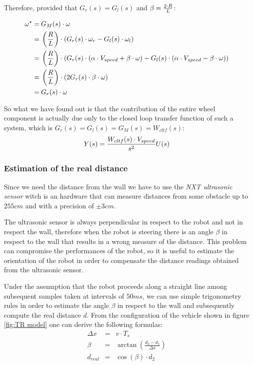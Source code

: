 Therefore, provided that $G_r(s)=G_l(s)$ and $\beta = {2\cdot R \over L}$:

\[
\begin{split}
\omega^\star
=&\: G_M(s)\cdot\omega\\
=&\: \left({R \over L}\right)\cdot (G_r(s)\cdot\omega_r - G_l(s)\cdot\omega_l)\\
=&\: \left({R \over L}\right)\cdot (G_r(s)\cdot(\alpha\cdot V_{speed} + \beta\cdot\omega) - G_l(s)\cdot (\alpha\cdot V_{speed} - \beta\cdot\omega))\\
=&\: \left({R \over L}\right)\cdot (2G_r(s)\cdot\beta\cdot\omega)\\
=&\: G_r(s) \cdot \omega\\
\end{split}
\]

So what we have found out is that the contribution of the entire wheel component is actually due only to the closed loop transfer function of such a system, which is $G_r(s)=G_l(s)=G_M(s)=W_{cltf}(s)$:
\[
Y(s) = {W_{cltf}(s)\cdot V_{speed} \over s^2}U(s)
\]

\subsubsection{Estimation of the real distance}

Since we need the distance from the wall we have to use the \emph{NXT ultrasonic sensor} witch is an hardware that can measure distances from some obstacle up to $255 cm$ and with a precision of $\pm 3 cm$.

The ultrasonic sensor is always  perpendicular in respect to the robot and not in respect the wall, therefore when the robot is steering there is an angle $\beta{}$ in respect to the wall that results in a wrong measure of the distance. This problem can compromise the performances of the robot, so it is useful to estimate the orientation of the robot in order to compensate the distance readings obtained from the ultrasonic sensor.

Under the assumption that the robot proceeds along a straight line among subsequent samples taken at intervals of $50ms$, we can use simple trigonometry rules in order to estimate the angle $\beta{}$ in respect to the wall and subsequently compute the real distance $d$. From the configuration of the vehicle shown in figure \ref{fig:TR model} one can derive the following formulas:\\
\[
\begin{array}{lcl}
\Delta{}x &=& v \cdot T_s \\
\beta &=& \arctan \left( \frac{d_{2} - d_{1}}{\Delta{}x} \right) \\
d_{real} &=& \cos(\beta) \cdot d_{2}\\
\end{array}
\]

